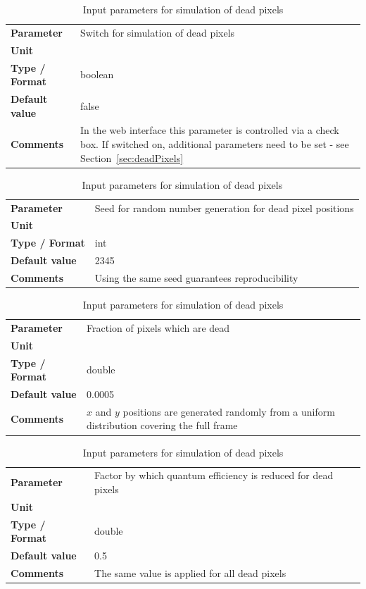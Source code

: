 \documentclass[11pt]{article}      %
\def\HCode#1{}
\def\htmlanchor#1{\HCode{<a id="#1"></a>}}
\begin{document}
\begin{table}[hb]
  \caption{Input parameters for simulation of dead pixels}

  \htmlanchor{doDeadPixels}
  \begin{tabular}{| l | p{13cm} |}
    \hline 
    {\bf Parameter} & Switch for simulation of dead pixels\\
    {\bf Unit} & \\
    {\bf Type / Format} & boolean\\
    {\bf Default value} & false\\
    {\bf Comments} & In the web interface this parameter is controlled via a check box.  If switched on, additional parameters need to be set - see Section~\ref{sec:deadPixels}\\
    \hline
  \end{tabular}
  \bigskip

  \htmlanchor{deadPixelPositionSeed}
  \begin{tabular}{| l | p{13cm} |}
    \hline 
    {\bf Parameter} & Seed for random number generation for dead pixel positions\\
    {\bf Unit} & \\
    {\bf Type / Format} & int\\
    {\bf Default value} & 2345\\
    {\bf Comments} & Using the same seed guarantees reproducibility\\
    \hline
  \end{tabular}
  \bigskip

  \htmlanchor{fracDeadPixels}
  \begin{tabular}{| l | p{13cm} |}
    \hline 
    {\bf Parameter} & Fraction of pixels which are dead\\
    {\bf Unit} & \\
    {\bf Type / Format} & double\\
    {\bf Default value} & 0.0005\\
    {\bf Comments} & $x$ and $y$ positions are generated randomly from a uniform distribution covering the full frame\\
    \hline
  \end{tabular}
  \bigskip

  \htmlanchor{deadPixelRelativeQE}
  \begin{tabular}{| l | p{13cm} |}
    \hline 
    {\bf Parameter} & Factor by which quantum efficiency is reduced for dead pixels\\
    {\bf Unit} & \\
    {\bf Type / Format} & double\\
    {\bf Default value} & 0.5\\
    {\bf Comments} & The same value is applied for all dead pixels\\
    \hline
  \end{tabular}
  \bigskip

  \label{tab:deadPixels}
\end{table}
\end{document}
